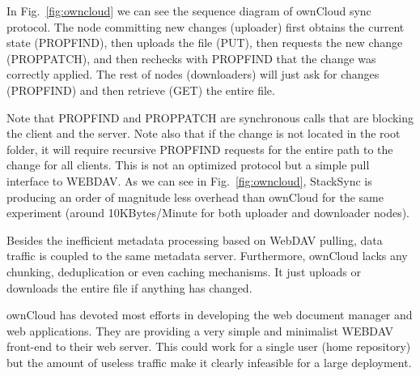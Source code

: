 In Fig.~\ref{fig:owncloud} we can see the sequence diagram of ownCloud sync protocol. The node committing new changes (uploader) first obtains the current state (PROPFIND), then uploads the file (PUT), then requests the new change (PROPPATCH), and then rechecks with PROPFIND that the change was correctly applied. The rest of nodes (downloaders) will just ask for changes (PROPFIND) and then retrieve (GET) the entire file. 


Note that PROPFIND and PROPPATCH are synchronous calls that are blocking the client and the server. Note also that if the change is not located in the root folder, it will require recursive PROPFIND requests for the entire path to the change for all clients.  This is not an optimized protocol but a simple pull interface to WEBDAV. As we can see in Fig.~\ref{fig:owncloud},  StackSync is producing an order of magnitude less overhead  than ownCloud for the same experiment  (around 10KBytes/Minute for both uploader and downloader nodes). 


Besides the inefficient metadata processing based on WebDAV pulling, data traffic is coupled to the same metadata server. Furthermore, ownCloud lacks any chunking, deduplication or even caching mechanisms. It just uploads or downloads the entire file if anything has changed.

ownCloud has devoted most efforts in developing the web document manager and web applications. They are providing a very simple and minimalist WEBDAV front-end  to their web server. This could work for a single user (home repository) but the amount of useless traffic make it clearly infeasible for a large deployment.
